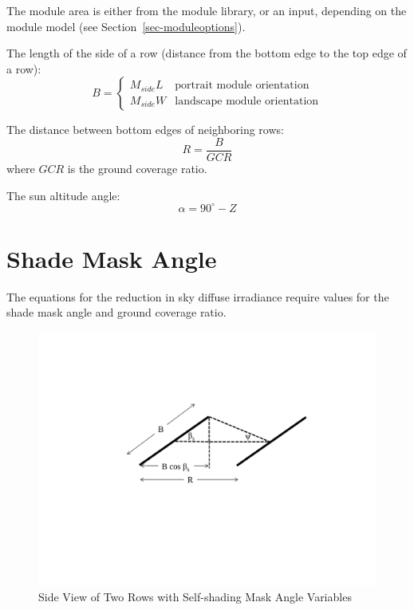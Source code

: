 \documentclass[12pt,letterpaper]{article}
\newcommand\GCR{\ensuremath{\mathit{GCR}}}
\begin{document}
The module area is either from the module library, or an input, depending on the module model (see Section~\ref{sec-moduleoptions}).

The length of the side of a row (distance from the bottom edge to the top edge of a row):
\[
B=
  \left\{
    \begin{array}{ll}
      M_{side} L & \mbox{portrait module orientation}\\
      M_{side} W & \mbox{landscape module orientation}
    \end{array}
  \right.
\]

The distance between bottom edges of neighboring rows:
\begin{equation}
R = \frac{B}{\GCR} 
\end{equation}
where $\GCR$ is the ground coverage ratio.

The sun altitude angle:
\begin{equation}
\alpha = 90^\circ-Z
\end{equation}

\section{Shade Mask Angle}

The equations for the reduction in sky diffuse irradiance require values for the shade mask angle and ground coverage ratio.

\begin{figure}
\begin{center}
\includegraphics[scale=0.66]{self-shading-mask-angle}
\caption{Side View of Two Rows with Self-shading Mask Angle Variables}
\label{fig-selfshadingmaskangle}
\end{center}
\end{figure}
\end{document}
